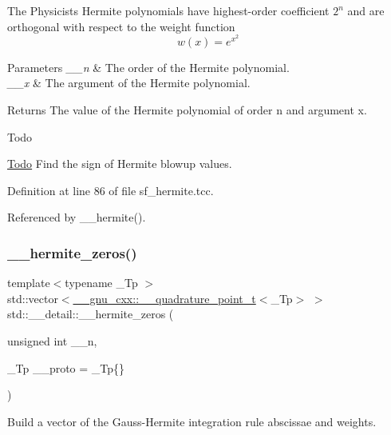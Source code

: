 The Physicists Hermite polynomials have highest-\/order coefficient $ 2^n $ and are orthogonal with respect to the weight function \[ w(x) = e^{x^2} \]


\begin{DoxyParams}{Parameters}
{\em \+\_\+\+\_\+n} & The order of the Hermite polynomial. \\
\hline
{\em \+\_\+\+\_\+x} & The argument of the Hermite polynomial. \\
\hline
\end{DoxyParams}
\begin{DoxyReturn}{Returns}
The value of the Hermite polynomial of order n and argument x. 
\end{DoxyReturn}
\begin{DoxyRefDesc}{Todo}
\item[\hyperlink{todo__todo000009}{Todo}]Find the sign of Hermite blowup values. \end{DoxyRefDesc}


Definition at line 86 of file sf\+\_\+hermite.\+tcc.



Referenced by \+\_\+\+\_\+hermite().

\mbox{\label{namespacestd_1_1____detail_a34e064cf8ddf0680ce559ba3f976c6dd}} 
\subsubsection{\texorpdfstring{\+\_\+\+\_\+hermite\+\_\+zeros()}{\_\_hermite\_zeros()}}
{\footnotesize\ttfamily template$<$typename \+\_\+\+Tp $>$ \\
std\+::vector$<$\hyperlink{struct____gnu__cxx_1_1____quadrature__point__t}{\+\_\+\+\_\+gnu\+\_\+cxx\+::\+\_\+\+\_\+quadrature\+\_\+point\+\_\+t}$<$\+\_\+\+Tp$>$ $>$ std\+::\+\_\+\+\_\+detail\+::\+\_\+\+\_\+hermite\+\_\+zeros (\begin{DoxyParamCaption}\item[{unsigned int}]{\+\_\+\+\_\+n,  }\item[{\+\_\+\+Tp}]{\+\_\+\+\_\+proto = {\ttfamily \+\_\+Tp\{\}} }\end{DoxyParamCaption})}

Build a vector of the Gauss-\/\+Hermite integration rule abscissae and weights. 

